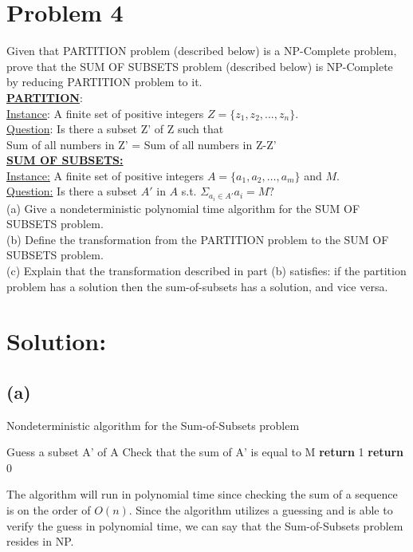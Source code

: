 
\section*{Problem 4}
	Given that PARTITION problem (described below) is a NP-Complete problem, prove that the SUM OF SUBSETS problem (described below) is NP-Complete by reducing PARTITION problem to it.\\
	
	\noindent
	\underline{\textbf{PARTITION}}:\\
	\underline{Instance}: A finite set of positive integers $Z = \{ z_1 , z_2 , ... , z_n \}$.\\
	\underline{Question}: Is there a subset Z' of Z such that\\
	Sum of all numbers in Z' = Sum of all numbers in Z-Z'\\
	
	\noindent
	\underline{\textbf{SUM OF SUBSETS:}}\\
	\underline{Instance:} A finite set of positive integers $A = \{a_1, a_2, \dots, a_m\}$ and $M$.\\
	\underline{Question:} Is there a subset $A'$ in $A$ s.t. $\Sigma_{a_i \in A'} a_i = M?$ \\
	
	\noindent
	(a) Give a nondeterministic polynomial time algorithm for the SUM OF SUBSETS problem.\\
	(b) Define the transformation from the PARTITION problem to the SUM OF SUBSETS problem.\\
	(c) Explain that the transformation described in part (b) satisfies: if the partition problem has a solution then the sum-of-subsets has a solution, and vice versa.
\section*{Solution:}
	\subsection*{(a)}
		\begin{algorithm}[H]
			\caption{Nondeterministic algorithm for the Sum-of-Subsets problem}
			\begin{algorithmic}[1]
				\State Guess a subset A' of A
				\State Check that the sum of A' is equal to M
				\State \textbf{return} 1
				\Else 
				\State \textbf{return} 0
				\EndIf
			\end{algorithmic}
		\end{algorithm}
	The algorithm will run in polynomial time since checking the sum of a sequence is on the order of $O(n)$.
	Since the algorithm utilizes a guessing and is able to verify the guess in polynomial time, we can say that the Sum-of-Subsets problem resides in NP. 
